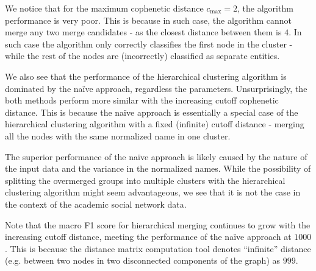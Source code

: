 
We notice that for the maximum cophenetic distance $c_{\text{max}} = 2$, the algorithm performance is very poor.
This is because in such case, the algorithm cannot merge any two merge candidates - as the closest distance between them is $4$.
In such case the algorithm only correctly classifies the first node in the cluster - while the rest of the nodes are (incorrectly) classified as separate entities.

We also see that the performance of the hierarchical clustering algorithm is dominated by the naïve approach, regardless the parameters.
Unsurprisingly, the both methods perform more similar with the increasing cutoff cophenetic distance. 
This is because the naïve approach is essentially a special case of the hierarchical clustering algorithm with a fixed (infinite) cutoff distance
 - merging all the nodes with the same normalized name in one cluster.

 The superior performance of the naïve approach is likely caused by the nature of the input data and the variance in the normalized names.
 While the possibility of splitting the overmerged groups into multiple clusters with the hierarchical clustering algorithm might seem advantageous,
 we see that it is not the case in the context of the academic social network data.

 Note that the macro F1 score for hierarchical merging continues to grow with the increasing cutoff distance, 
 meeting the performance of the naïve approach at $1000$. This is because the distance matrix computation tool 
 denotes “infinite” distance (e.g. between two nodes in two disconnected components of the graph) as $999$.